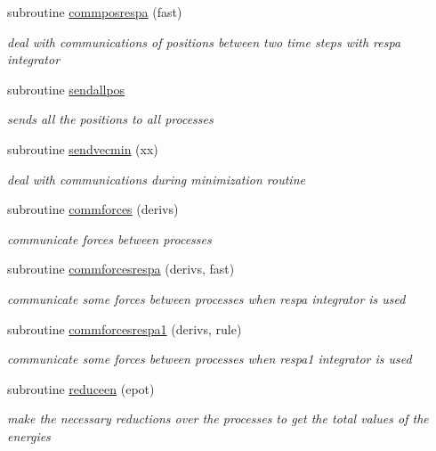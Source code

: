 \begin{DoxyCompactItemize}
subroutine \hyperlink{mpistuff_8f90_a79baf1e708004c1496d81d071000f6dc}{commposrespa} (fast)
\begin{DoxyCompactList}\small\item\em deal with communications of positions between two time steps with respa integrator \end{DoxyCompactList}\item 
subroutine \hyperlink{mpistuff_8f90_a0127816c8600b62744df28c7d36fc288}{sendallpos}
\begin{DoxyCompactList}\small\item\em sends all the positions to all processes \end{DoxyCompactList}\item 
subroutine \hyperlink{mpistuff_8f90_ab30e2903d42184126cc5b095668ecf31}{sendvecmin} (xx)
\begin{DoxyCompactList}\small\item\em deal with communications during minimization routine \end{DoxyCompactList}\item 
subroutine \hyperlink{mpistuff_8f90_a796b3470d8a1bbba2e89551334366de4}{commforces} (derivs)
\begin{DoxyCompactList}\small\item\em communicate forces between processes \end{DoxyCompactList}\item 
subroutine \hyperlink{mpistuff_8f90_a2cfc5b90a01eb9ee30bcfa6a46b00d77}{commforcesrespa} (derivs, fast)
\begin{DoxyCompactList}\small\item\em communicate some forces between processes when respa integrator is used \end{DoxyCompactList}\item 
subroutine \hyperlink{mpistuff_8f90_aac6b485f4f510ce7355365d0292661b4}{commforcesrespa1} (derivs, rule)
\begin{DoxyCompactList}\small\item\em communicate some forces between processes when respa1 integrator is used \end{DoxyCompactList}\item 
subroutine \hyperlink{mpistuff_8f90_ab6aa7f6aa468b17cf44590a9eb028eea}{reduceen} (epot)
\begin{DoxyCompactList}\small\item\em make the necessary reductions over the processes to get the total values of the energies \end{DoxyCompactList}\item 

\end{DoxyCompactItemize}
